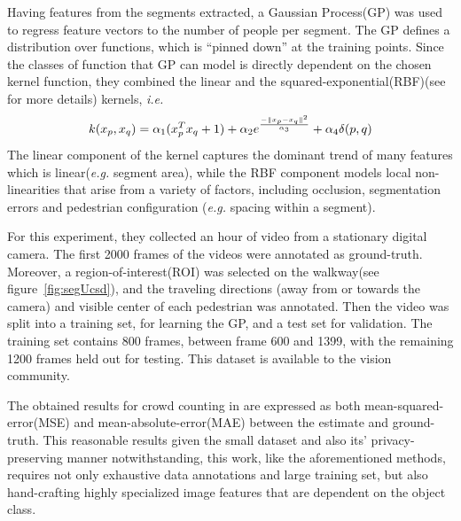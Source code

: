 Having features from the segments extracted, a Gaussian Process(GP)\cite{williams2006gaussian} was used to regress feature vectors to the number of people per segment. The GP defines a distribution over functions, which is “pinned down” at the training points\cite{chan2008privacy}. Since the classes of function that GP can model is directly dependent on the chosen kernel function, they combined the linear and the squared-exponential(RBF)(see \cite{chang2010training, vert2004primer, shashua2009introduction} for more details) kernels, \textit{i.e.}
\begin{equation}
\centering k(x_p, x_q) = \alpha_1(x_p^{T}x_q+1) + \alpha_2e^{\frac{-\|x_p-x_q\|^2}{\alpha_3}} + \alpha_4\delta(p,q)     
\end{equation}
The linear component of the kernel captures the dominant trend of many features which is linear(\textit{e.g.} segment area), while the RBF component models local non-linearities that arise from a variety of factors, including occlusion, segmentation errors and pedestrian configuration (\textit{e.g.} spacing within a segment)\cite{chan2008privacy}. 
  
For this experiment, they collected an hour of video from a stationary digital camera. The first 2000 frames of the videos were annotated as ground-truth. Moreover, a region-of-interest(ROI) was selected on the walkway(see figure~\ref{fig:segUcsd}), and the traveling directions (away from or towards the camera) and visible center of each pedestrian was annotated. Then the video was split into a training set, for learning the GP, and a test set for validation. The training set contains 800 frames, between frame 600 and 1399, with the remaining 1200 frames held out for testing. This dataset is available to the vision community\cite{chan2008privacy}.

The obtained results for crowd counting in \cite{chan2008privacy} are expressed as both mean-squared-error(MSE) and mean-absolute-error(MAE) between the estimate and ground-truth. This reasonable results given the small dataset and also its' privacy-preserving manner notwithstanding, this work, like the aforementioned methods, requires not only exhaustive data annotations and large training set, but also hand-crafting highly specialized image features that are dependent on the object class. 


